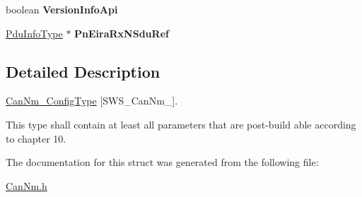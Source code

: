 \begin{DoxyCompactItemize}
\item 
boolean {\bfseries Version\+Info\+Api}\hypertarget{structCanNm__ConfigType_a34b9b75c3e6ad5002f93ec562d48023e}{}\label{structCanNm__ConfigType_a34b9b75c3e6ad5002f93ec562d48023e}

\item 
\hyperlink{structPduInfoType}{Pdu\+Info\+Type} $\ast$ {\bfseries Pn\+Eira\+Rx\+N\+Sdu\+Ref}\hypertarget{structCanNm__ConfigType_a780cf83d558188d1bcce63a4f8f98418}{}\label{structCanNm__ConfigType_a780cf83d558188d1bcce63a4f8f98418}

\end{DoxyCompactItemize}


\subsection{Detailed Description}
\hyperlink{structCanNm__ConfigType}{Can\+Nm\+\_\+\+Config\+Type} \mbox{[}S\+W\+S\+\_\+\+Can\+Nm\+\_\mbox{]}. 

This type shall contain at least all parameters that are post-\/build able according to chapter 10. 

The documentation for this struct was generated from the following file\+:\begin{DoxyCompactItemize}
\item 
\hyperlink{CanNm_8h}{Can\+Nm.\+h}\end{DoxyCompactItemize}
